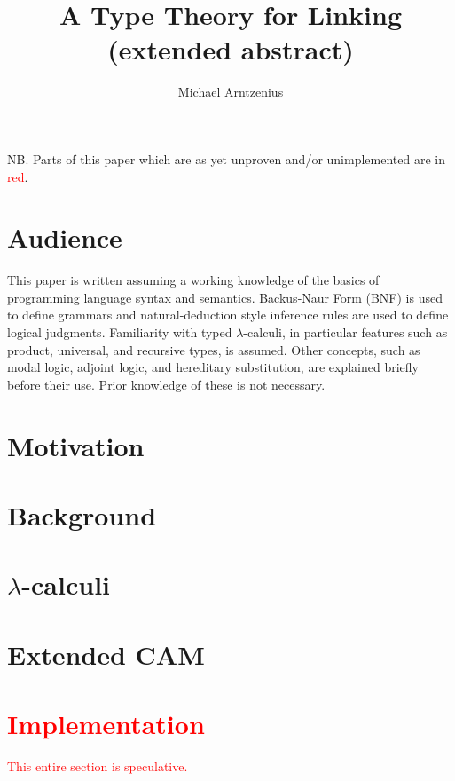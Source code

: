 \documentclass[11pt]{article}
\title{A Type Theory for Linking\\{\large (extended abstract)}}
\author{Michael Arntzenius}
\newcommand{\bscolor}{red}
\newcommand{\bs}[1]{\textcolor{\bscolor}{#1}}
\begin{document}
\maketitle

{\small NB. Parts of this paper which are as yet unproven and/or unimplemented
  are in \bs{\bscolor}.}


\section{Audience}

This paper is written assuming a working knowledge of the basics of programming
language syntax and semantics. Backus-Naur Form (BNF) is used to define grammars
and natural-deduction style inference rules are used to define logical
judgments. Familiarity with typed $\lambda$-calculi, in particular features such
as product, universal, and recursive types, is assumed. Other concepts, such as
modal logic, adjoint logic, and hereditary substitution, are explained briefly
before their use. Prior knowledge of these is not necessary.





\section{Motivation}

\section{Background}

\section{$\lambda$-calculi}

\section{Extended CAM}

\section{\bs{Implementation}}

\bs{This entire section is speculative.}
\end{document}
